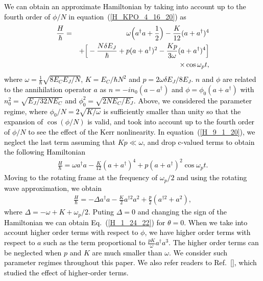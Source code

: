 \documentclass[%
 reprint,
 amsmath,amssymb,
 aps,
pra,
]{revtex4-2}
\begin{document}
\textcolor{black}{
We can obtain an approximate Hamiltonian by taking into account up to the fourth order of $\phi/N$ in equation~(\ref{H_KPO_4_16_20}) as
\begin{eqnarray}
\frac{H}{\hbar} &=& \omega \Big{(} a^\dagger a + \frac{1}{2} \Big{)}
- \frac{K}{12} (a + a^\dagger)^4
\nonumber\\
 && + \Big{[} - \frac{N\delta E_J}{\hbar}  +
 p (a + a^\dagger)^2  - \frac{K p}{3\omega} (a + a^\dagger)^4 \Big{]}\nonumber\\
 && \times \cos\omega_p t,
\label{H_9_1_20}
\end{eqnarray}
where $\omega = \frac{1}{\hbar}\sqrt{8E_CE_J/N}$, $K=E_C/\hbar N^2$ and $p = 2\omega \delta E_J/ 8E_J$. 
$n$ and $\phi$ are related to the annihilation operator $a$ as
$n = -in_0(a-a^\dagger)$ and $\phi = \phi_0 (a+a^\dagger)$
with $n_0^2=\sqrt{E_J/32 N E_C}$ and $\phi_0^2 = \sqrt{2NE_C/E_J}$.
Above, we considered the parameter regime, where $\phi_0/N = 2\sqrt{K/\omega}$ is sufficiently smaller than unity so that the expansion of $\cos(\phi/N)$ is valid,
and took into account up to the fourth order of $\phi/N$ to see the effect of the Kerr nonlinearity.
In equation~(\ref{H_9_1_20}), we neglect the last term assuming that $Kp\ll  \omega$, and drop c-valued terms to obtain the following Hamiltonian
\begin{eqnarray}
\frac{H}{\hbar} = \omega a^\dagger a 
- \frac{K}{12} (a + a^\dagger)^4
+ p (a + a^\dagger)^2
\cos\omega_p t.
\end{eqnarray}
Moving to the rotating frame at the frequency of $\omega_p/2$ and using the rotating wave approximation, we obtain 
\begin{eqnarray}
\frac{H}{\hbar} = -\Delta a^\dagger a - \frac{K}{2}a^{\dagger 2} a^2 + \frac{p}{2}(a^{\dagger 2} + a^2),
\end{eqnarray}
where $\Delta=-\omega + K + \omega_p/2$.
Puting $\Delta=0$ and changing the sign of the Hamiltonian we can obtain Eq.~(\ref{H_1_24_22}) for $\theta=0$.
}
\textcolor{black}{When we take into account higher order terms with respect to $\phi$, we have higher order terms with respect to $a$ such as the term proportional to  $\frac{pK}{\omega}a^\dagger a^3$.
The higher order terms can be neglected when $p$ and $K$ are much smaller than $\omega$. We consider such parameter regimes throughout this paper.
We also refer readers to Ref.~[], which studied the effect of higher-order terms.}
\end{document}
